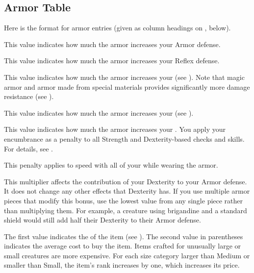   \subsection{Armor Table}
    \par Here is the format for armor entries (given as column headings on , below).

     This value indicates how much the armor increases your Armor defense.

     This value indicates how much the armor increases your Reflex defense.

     This value indicates how much the armor increases your  (see ).
    Note that magic armor and armor made from special materials provides significantly more damage resistance (see ).

     This value indicates how much the armor increases your  (see ).

     This value indicates how much the armor increases your .
    You apply your encumbrance as a penalty to all Strength and Dexterity-based checks and skills.
    For details, see .

     This penalty applies to speed with all of your  while wearing the armor.

     This multiplier affects the contribution of your Dexterity to your Armor defense.
    It does not change any other effects that Dexterity has.
    If you use multiple armor pieces that modify this bonus, use the lowest value from any single piece rather than multiplying them.
    For example, a creature using brigandine and a standard shield would still add half their Dexterity to their Armor defense.

     The first value indicates the  of the item (see ).
    The second value in parentheses indicates the average cost to buy the item.
    Items crafted for unusually large or small creatures are more expensive.
    For each size category larger than Medium or smaller than Small, the item's rank increases by one, which increases its price.

